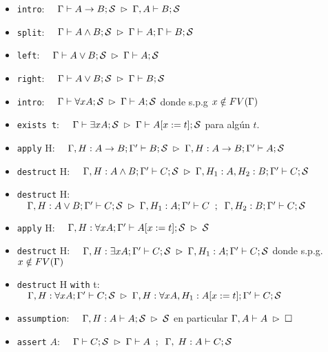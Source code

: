 \documentclass[11pt,letterpaper]{article}
\begin{document}
\begin{itemize}
 \item \texttt{intro}: $\quad \Gamma\vdash A\to B;\mathcal{S}\;\rhd\; \Gamma,A\vdash B;\mathcal{S}$
\vspace*{5pt}
 \item \texttt{split}: 
 $\quad \Gamma\vdash A\land B;\mathcal{S}\;\rhd\; \Gamma\vdash A; \Gamma\vdash B;\mathcal{S}$
\vspace*{5pt}
 \item \texttt{left}: $\quad \Gamma\vdash A\lor B;\mathcal{S}\;\rhd\; \Gamma\vdash A;\mathcal{S}$
\vspace*{5pt}
 \item \texttt{right}: $\quad \Gamma\vdash A\lor B;\mathcal{S}\;\rhd\; \Gamma\vdash B;\mathcal{S}$
\vspace*{5pt} 
 \item \texttt{intro}: 
 $\quad \Gamma\vdash \forall x A;\mathcal{S}\;\rhd\;\Gamma\vdash A;\mathcal{S}$ donde s.p.g 
 $x\notin FV(\Gamma)$
\vspace*{5pt}
 \item \texttt{exists t}: 
 $\quad \Gamma\vdash \exists x A;\mathcal{S}\;\rhd\;\Gamma\vdash A[x:=t];\mathcal{S}$ para algún $t$.
\vspace*{5pt}
 \item \texttt{apply} H: 
 $\quad \Gamma,H: A\to B;\Gamma'\vdash B;\mathcal{S}\;\rhd\; \Gamma,H:A\to B;\Gamma'\vdash A;\mathcal{S}$
 \item \texttt{destruct} H: 
 $\quad \Gamma,H:A\land B;\Gamma'\vdash C;\mathcal{S}\;\rhd\; \Gamma,H_1:A, H_2: B;\Gamma'\vdash C;\mathcal{S}$
\vspace*{5pt}
 \item \texttt{destruct} H: 
 $\quad \Gamma,H:A\lor B;\Gamma'\vdash C;\mathcal{S}\;\rhd\;\Gamma,H_1: A;\Gamma'\vdash C\;\;;\;\;\Gamma,H_2:B;\Gamma'\vdash C;\mathcal{S}$
\vspace*{5pt}
 \item \texttt{apply} H: 
 $\quad \Gamma, H:\forall xA;\Gamma'\vdash A[x:=t];\mathcal{S}\;\rhd\;\mathcal{S}$
\vspace*{5pt}
 \item \texttt{destruct} H: 
 $\quad \Gamma, H: \exists x A;\Gamma'\vdash C;\mathcal{S}\;\rhd\; \Gamma, H_1:A;\Gamma'\vdash C;\mathcal{S}$
 donde s.p.g. 
  $x\notin FV(\Gamma)$
\vspace*{5pt}
 \item \texttt{destruct} H \texttt{with} t: 
 $\quad \Gamma, H: \forall x A;\Gamma'\vdash C;\mathcal{S}\;\rhd\; \Gamma, H:\forall x A, H_1 : A[x:=t];\Gamma'\vdash C;\mathcal{S}$
\vspace*{5pt}
 \item \texttt{assumption}: $\quad \Gamma,H:A\vdash A;\mathcal{S} \;\rhd\; \mathcal{S}$ 
 en particular $\Gamma,A\vdash A\;\rhd\;\Box$
\vspace*{5pt}
 \item \texttt{assert} 
 $A$: $\quad \Gamma\vdash C;\mathcal{S}\;\rhd\; \Gamma\vdash A\;\;;\;\;\Gamma,\;H:A\vdash C;\mathcal{S}$
\end{itemize}
\end{document}
